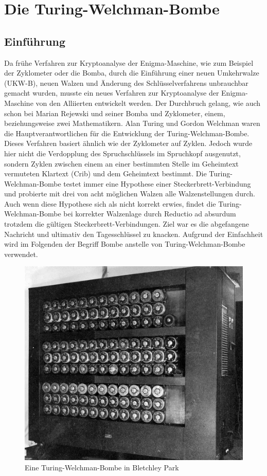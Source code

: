\chapter{Die Turing-Welchman-Bombe}\label{ch:die-turing-bombe}

\section{Einführung}\label{sec:einfuerung_bombe}

Da frühe Verfahren zur Kryptoanalyse der Enigma-Maschine, wie zum Beispiel der \glqq Zyklometer\grqq{} oder die \glqq Bomba\grqq{}, durch die Einführung einer neuen Umkehrwalze (UKW-B), neuen Walzen und Änderung des Schlüsselverfahrens unbrauchbar gemacht wurden, musste ein neues Verfahren zur Kryptoanalyse der Enigma-Maschine von den Alliierten entwickelt werden. 
Der Durchbruch gelang, wie auch schon bei Marian Rejewski und seiner Bomba und Zyklometer, einem, beziehungsweise zwei Mathematikern.
Alan Turing und Gordon Welchman waren die Hauptverantwortlichen für die Entwicklung der \glqq Turing-Welchman-Bombe\grqq. 
Dieses Verfahren basiert ähnlich wie der Zyklometer auf \glqq Zyklen\grqq. 
Jedoch wurde hier nicht die Verdopplung des Spruchschlüssels im Spruchkopf ausgenutzt, sondern Zyklen zwischen einem an einer bestimmten Stelle im Geheimtext vermuteten Klartext (Crib) und dem Geheimtext bestimmt.
Die Turing-Welchman-Bombe testet immer eine Hypothese einer Steckerbrett-Verbindung und probierte mit drei von acht möglichen Walzen alle Walzenstellungen durch.
Auch wenn diese Hypothese sich als nicht korrekt erwies, findet die Turing-Welchman-Bombe bei korrekter Walzenlage durch Reductio ad absurdum trotzdem die gültigen Steckerbrett-Verbindungen.
Ziel war es die abgefangene Nachricht und ultimativ den Tagesschlüssel zu knacken.
Aufgrund der Einfachheit wird im Folgenden der Begriff \glqq Bombe\grqq{} anstelle von \glqq Turing-Welchman-Bombe\grqq{} verwendet.
\nopagebreak
\begin{figure}
	\centering
	\includegraphics[width=0.4\linewidth]{Turing Bomb/BletchleyParkBombe}
	\caption{Eine Turing-Welchman-Bombe in Bletchley Park\autocite{wiki:bombe_picture}}
	\label{fig:bombe}
\end{figure}

